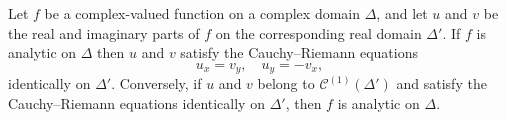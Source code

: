 Let $f$ be a complex-valued function on a complex domain $\Delta$, and let $u$ and $v$ be the real and imaginary parts of $f$ on the corresponding real domain $\Delta'$. If $f$ is analytic on $\Delta$ then $u$ and $v$ satisfy the Cauchy--Riemann equations
$$u_x = v_y, \quad u_y = -v_x,$$
identically on $\Delta'$. Conversely, if $u$ and $v$ belong to $\mathcal{C}^{(1)}(\Delta')$ and satisfy the Cauchy--Riemann equations identically on $\Delta'$, then $f$ is analytic on $\Delta$.
